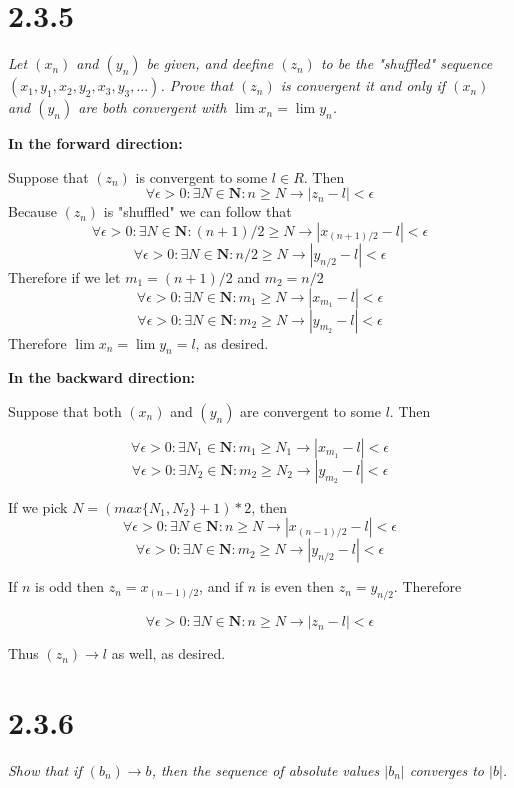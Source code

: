 \documentclass[11pt,oneside,titlepage]{article}
\begin{document}
\section*{2.3.5}
\textit{Let $(x_n)$ and $(y_n)$ be given, and deefine $(z_n)$ to be the
  "shuffled" sequence $(x_1, y_1, x_2, y_2, x_3, y_3, ...)$. Prove that
  $(z_n)$ is convergent it and only if $(x_n)$ and $(y_n)$ are both
  convergent with $\lim x_n = \lim y_n $.}

\textbf{In the forward direction:}

Suppose that $(z_n)$ is convergent to some $l \in R$. Then 
$$\forall \epsilon > 0: \exists N \in \textbf{N}: n \geq N \to |z_n - l| < \epsilon$$
Because $(z_n)$ is "shuffled" we can follow that 
$$\forall \epsilon > 0: \exists N \in \textbf{N}: (n + 1) / 2 \geq N \to
|x_{(n + 1) / 2} - l| < \epsilon$$
$$\forall \epsilon > 0: \exists N \in \textbf{N}: n  / 2 \geq N \to |y_{n/2} - l| < \epsilon$$
Therefore if we let $m_1 = (n + 1) / 2$ and $m_2 = n/2$
$$\forall \epsilon > 0: \exists N \in \textbf{N}: m_1 \geq N \to |x_{m_1} - l| < \epsilon$$
$$\forall \epsilon > 0: \exists N \in \textbf{N}: m_2 \geq N \to |y_{m_2} - l| < \epsilon$$
Therefore $\lim x_n = \lim y_n = l$, as desired.

\textbf{In the backward direction:}

Suppose that both $(x_n)$ and $(y_n)$ are convergent to some $l$. Then

$$\forall \epsilon > 0: \exists N_1 \in \textbf{N}: m_1 \geq N_1 \to |x_{m_1} - l| < \epsilon$$
$$\forall \epsilon > 0: \exists N_2 \in \textbf{N}: m_2 \geq N_2 \to |y_{m_2} - l| < \epsilon$$

If we pick $N = (max\{N_1, N_2\} + 1) * 2$, then
$$\forall \epsilon > 0: \exists N \in \textbf{N}: n \geq N \to |x_{(n - 1) / 2 } - l| < \epsilon$$
$$\forall \epsilon > 0: \exists N \in \textbf{N}: m_2 \geq N \to |y_{n/2} - l| < \epsilon$$

If $n$ is odd then  $z_n = x_{(n - 1) / 2}$, and if $n$ is even
then $z_n = y_{n/2}$. Therefore 

$$\forall \epsilon > 0: \exists N \in \textbf{N}: n \geq N \to |z_n - l| < \epsilon$$

Thus $(z_n) \to l$ as well, as desired.

\section*{2.3.6}
\textit{Show that if $(b_n) \to b$, then the sequence of absolute values
  $|b_n|$ converges to $|b|$.}
\end{document}

